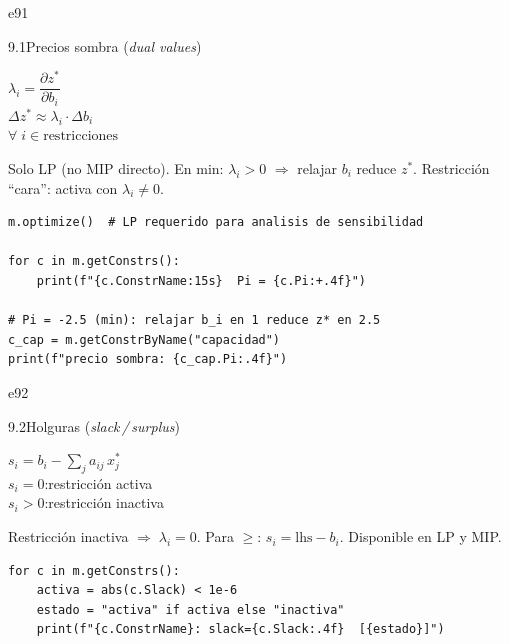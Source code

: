 \documentclass[10pt,a4paper]{article}
\newlength{\mathcolw}
\newlength{\codecolw}
\newcommand{\entryheader}[2][]{%
  \needspace{5cm}%
  \vspace{6pt}%
  \ifx\relax#1\relax\else\phantomsection\hypertarget{#1}{}\fi%
  \noindent%
  \begin{tcolorbox}[
    colback=subsecbg!18,
    colframe=subsecbg!45,
    sharp corners, boxrule=0.4pt,
    left=5pt, right=5pt, top=2pt, bottom=2pt,
    fontupper=\small\bfseries\sffamily,
  ]
  #2
  \end{tcolorbox}%
  \vspace{2pt}%
}
\begin{document}
\entryheader[e91]{9.1\quad Precios sombra (\textit{dual values})}
\noindent
\begin{minipage}[t]{\mathcolw}
    \begin{tcolorbox}[mathbox]
        $\lambda_i = \dfrac{\partial z^*}{\partial b_i}$\\[6pt]
        $\Delta z^* \approx \lambda_i \cdot \Delta b_i$\\[4pt]
        $\forall\; i \in \text{restricciones}$
    \end{tcolorbox}
    \vspace{2pt}
    \begin{tcolorbox}[notebox]
        Solo LP (no MIP directo). En min: $\lambda_i > 0$ $\Rightarrow$ relajar $b_i$ reduce $z^*$. Restricci\'on ``cara'': activa con $\lambda_i \neq 0$.
    \end{tcolorbox}
\end{minipage}\hspace{0.02\textwidth}%
\begin{minipage}[t]{\codecolw}
    \begin{lstlisting}[style=gurobipy]
m.optimize()  # LP requerido para analisis de sensibilidad

for c in m.getConstrs():
    print(f"{c.ConstrName:15s}  Pi = {c.Pi:+.4f}")

# Pi = -2.5 (min): relajar b_i en 1 reduce z* en 2.5
c_cap = m.getConstrByName("capacidad")
print(f"precio sombra: {c_cap.Pi:.4f}")
    \end{lstlisting}
\end{minipage}

\vspace{4pt}

\entryheader[e92]{9.2\quad Holguras (\textit{slack\,/\,surplus})}
\noindent
\begin{minipage}[t]{\mathcolw}
    \begin{tcolorbox}[mathbox]
        $s_i = b_i - \displaystyle\sum_j a_{ij}\,x_j^*$\\[4pt]
        $s_i = 0$:\enspace restricci\'on activa\\[2pt]
        $s_i > 0$:\enspace restricci\'on inactiva
    \end{tcolorbox}
    \vspace{2pt}
    \begin{tcolorbox}[notebox]
        Restricci\'on inactiva $\Rightarrow\;\lambda_i = 0$. Para $\geq$:\; $s_i = \text{lhs} - b_i$. Disponible en LP y MIP.
    \end{tcolorbox}
\end{minipage}\hspace{0.02\textwidth}%
\begin{minipage}[t]{\codecolw}
    \begin{lstlisting}[style=gurobipy]
for c in m.getConstrs():
    activa = abs(c.Slack) < 1e-6
    estado = "activa" if activa else "inactiva"
    print(f"{c.ConstrName}: slack={c.Slack:.4f}  [{estado}]")
    \end{lstlisting}
\end{minipage}
\end{document}
